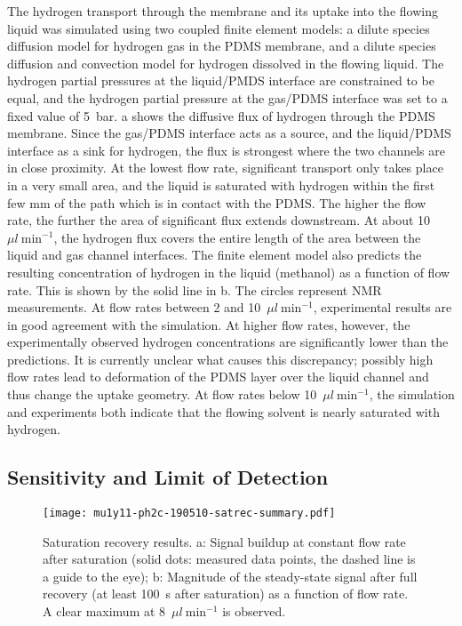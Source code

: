 The hydrogen transport through the membrane and its uptake into the flowing
liquid was simulated using two coupled finite element models: a dilute species
diffusion model for hydrogen gas in the PDMS membrane, and a dilute species
diffusion and convection model for hydrogen dissolved in the flowing liquid. The
hydrogen partial pressures at the liquid/PMDS interface are constrained to be
equal, and the hydrogen partial pressure at the gas/PDMS interface was set to a
fixed value of 5~bar. a shows the diffusive flux of hydrogen
through the PDMS membrane.  Since the gas/PDMS interface acts as a source, and
the liquid/PDMS interface as a sink for hydrogen, the flux is strongest where
the two channels are in close proximity. At the lowest flow rate, significant
transport only takes place in a very small area, and the liquid is saturated
with hydrogen within the first few mm of the path which is in contact with the
PDMS. The higher the flow rate, the further the area of significant flux extends
downstream. At about 10~$\mu{l}~\text{min}^{-1}$, the hydrogen flux covers
the entire length of the area between the liquid and gas channel interfaces. The
finite element model also predicts the resulting concentration of hydrogen in
the liquid (methanol) as a function of flow rate. This is shown by the solid
line in  b. The circles represent NMR measurements. At
flow rates between 2 and 10~$\mu{l}~\text{min}^{-1}$, experimental results are
in good agreement with the simulation. At higher flow rates, however, the
experimentally observed hydrogen concentrations are significantly lower than the
predictions. It is currently unclear what causes this discrepancy; possibly high
flow rates lead to deformation of the PDMS layer over the liquid channel and
thus change the uptake geometry. At flow rates below 10~$\mu{l}~\text{min}^{-1}$,
the simulation and experiments both indicate that the flowing
solvent is nearly saturated with hydrogen.


\subsection{Sensitivity and Limit of Detection}

\begin{figure}
	\centering
	\texttt{[image: mu1y11-ph2c-190510-satrec-summary.pdf]}
	\caption{Saturation recovery results.
  a: Signal buildup at constant
	flow rate after saturation (solid dots: measured data points,
  the dashed line is a guide to the eye);
	b: Magnitude of the steady-state signal after full recovery (at least
	100~s after saturation) as a function of flow rate. A clear maximum
	at 8~$\mu{l}~\text{min}^{-1}$ is observed.}
	\label{fig:satrec-summary}
\end{figure}


